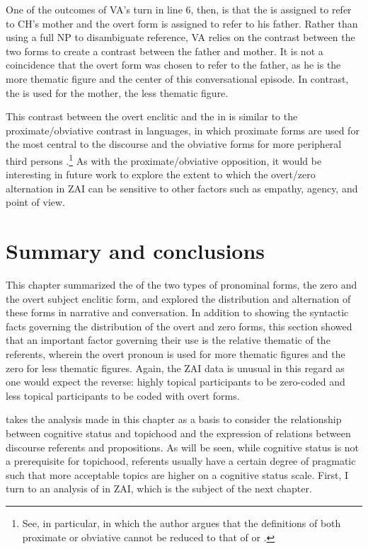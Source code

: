 One of the outcomes of VA's turn in line 6, then, is that the  is assigned to refer to CH's mother and the overt form is assigned to refer to his father. Rather than using a full NP to disambiguate reference, VA relies on the contrast between the two  forms to create a contrast between the father and mother. It is not a coincidence that the overt form was chosen to refer to the father, as he is the more thematic figure and the center of this conversational episode. In contrast, the  is used for the mother, the less thematic figure.

This contrast between the overt enclitic and the  in  is similar to the proximate/obviative contrast in  languages, in which proximate forms are used for the  most central to the discourse and the obviative forms for more peripheral third persons \citep{dahlstrom1991,dahlstrom2003,dahlstrom2014}.\footnote{See, in particular, \citet{dahlstrom2014} in which the author argues that the definitions of both proximate or obviative cannot be reduced to that of  or .} As with the proximate/obviative opposition, it would be interesting in future work to explore the extent to which the overt/zero alternation in ZAI can be sensitive to other factors such as empathy, agency, and point of view.


\section{Summary and conclusions}
This chapter summarized the  of the two types of  pronominal forms, the zero and the overt subject enclitic form, and explored the distribution and alternation of these forms in narrative and conversation. In addition to showing the syntactic facts governing the distribution of the overt and zero forms, this section showed that an important factor governing their use is the relative thematic  of the referents, wherein the overt pronoun is used for more thematic figures and the zero for less thematic figures. Again, the ZAI data is unusual in this regard as one would expect the reverse: highly topical participants to be zero-coded and less topical participants to be coded with overt forms.

 takes the analysis made in this chapter as a basis to consider the relationship between cognitive status and topichood and the expression of  relations between discourse referents and propositions. As will be seen, while cognitive status is not a prerequisite for topichood,  referents usually have a certain degree of pragmatic  such that more acceptable topics are higher on a cognitive status scale. First, I turn to an analysis of  in ZAI, which is the subject of the next chapter.

\lehead{\headmark}